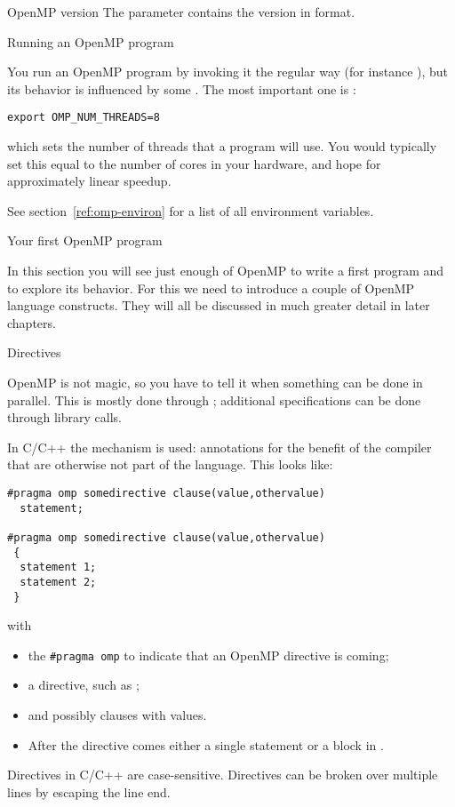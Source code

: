 \begin{fortrannote}{OpenMP version}
  The parameter  contains the version in  format.
\end{fortrannote}


 {Running an OpenMP program}

You run an OpenMP program by invoking it the regular way (for instance ),
but its behavior is influenced by some .
The most important one is :
\begin{verbatim}
export OMP_NUM_THREADS=8
\end{verbatim}
which sets the number of threads that a program will use.
You would typically set this equal to the number of cores
in your hardware, and hope for approximately linear speedup.

See section~\ref{ref:omp-environ} for a list of all environment variables.


 {Your first OpenMP program}

In this section you will see just enough of OpenMP to write a first
program and to explore its behavior. For this we need to introduce a
couple of OpenMP language constructs. They will all be discussed in
much greater detail in later chapters.

 {Directives}
\label{sec:omp-directives}

OpenMP is not magic, so you have to tell it when something
can be done in parallel. This is mostly done through ;
additional specifications can be done through library calls.

In C/C++ the  mechanism is used: annotations for
the benefit of the compiler that are otherwise not part of the
language. This looks like:
\begin{lstlisting}
#pragma omp somedirective clause(value,othervalue)
  statement;

#pragma omp somedirective clause(value,othervalue)
 {
  statement 1;
  statement 2;
 }
\end{lstlisting}
with
\begin{itemize}
\item the \verb+#pragma omp+  to indicate that
  an OpenMP directive is coming;
\item a directive, such as ;
\item and possibly clauses with values.
\item After the directive comes either a single statement or a block
  in .
\end{itemize}
Directives in C/C++ are case-sensitive. Directives can be broken over
multiple lines by escaping the line end.

